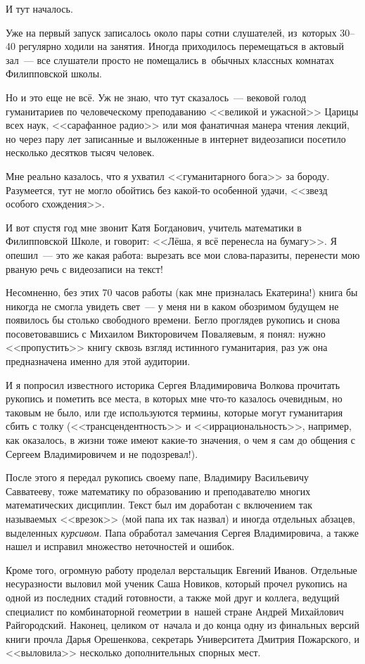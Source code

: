 {И тут началось.

Уже на первый запуск записалось около пары сотни слушателей, из~которых 30--40 регулярно
ходили на занятия. Иногда приходилось перемещаться в актовый зал~--- все слушатели просто
не помещались в~обычных классных комнатах Филипповской школы.

Но и это еще не всё. Уж не знаю, что тут сказалось~--- вековой голод гуманитариев по
человеческому преподаванию <<великой и ужасной>> Царицы всех наук, <<сарафанное
радио>> или моя фанатичная манера чтения лекций, но через пару лет записанные и
выложенные в интернет видеозаписи посетило несколько десятков тысяч человек.

Мне реально казалось, что я ухватил <<гуманитарного бога>> за бороду. Разумеется,
тут не могло обойтись без какой-то особенной удачи, <<звезд особого схождения>>.

И вот спустя год мне звонит Катя Богданович, учитель математики в Филипповской
Школе, и говорит: <<Лёша, я всё перенесла на бумагу>>. Я опешил~--- это же какая работа:
вырезать все мои слова-паразиты, перенести мою рваную речь с видеозаписи на текст!

Несомненно, без этих 70 часов работы (как мне призналась Екатерина!) книга бы никогда
не смогла увидеть свет~--- у меня ни в каком обозримом будущем не появилось бы столько
свободного времени. Бегло проглядев рукопись и снова посоветовавшись с Михаилом
Викторовичем Поваляевым, я понял: нужно <<пропустить>> книгу сквозь взгляд истинного
гуманитария, раз уж она предназначена именно для этой аудитории.

И я попросил известного историка Сергея Владимировича Волкова прочитать рукопись
и пометить все места, в которых мне что-то казалось очевидным, но таковым не было, или
где используются термины, которые могут гуманитария сбить с толку (<<трансцендентность>>
и <<иррациональность>>, например, как оказалось, в жизни тоже имеют какие-то значения,
о чем я сам до общения с Сергеем Владимировичем и не подозревал!).

После этого я передал рукопись своему папе, Владимиру Васильевичу Савватееву, тоже
математику по образованию и преподавателю многих математических дисциплин.
Текст был им доработан с включением так называемых <<врезок>> (мой папа их так назвал) и
иногда отдельных абзацев, выделенных \textit{курсивом}.
Папа обработал замечания
Сергея Владимировича, а также нашел и исправил множество неточностей и ошибок.

Кроме того, огромную работу проделал верстальщик Евгений Иванов. Отдельные несуразности выловил
мой ученик Саша Новиков, который прочел рукопись на одной из последних стадий готовности, а также
мой друг и коллега, ведущий специалист по комбинаторной геометрии в~нашей стране Андрей Михайлович
Райгородский. Наконец, целиком от~начала и до конца одну из финальных версий книги прочла Дарья
Орешенкова, секретарь Университета Дмитрия Пожарского, и <<выловила>> несколько дополнительных
спорных мест.

}

